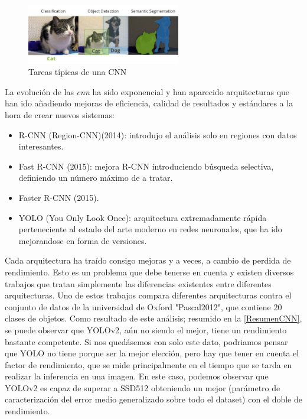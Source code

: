 \begin{figure}[H]
    \centering
    \includegraphics[width=0.6\textwidth]{images/4/TiposTareas.png}
    \caption{Tareas típicas de una CNN\cite{kallfelzsirmacekSEQUENTIALIMAGEPROCESSING2019}}
    \label{fig:tareasCNN}
\end{figure}

La evolución de las \textit{\acrshort{cnn}} ha sido exponencial y han aparecido arquitecturas que han ido añadiendo mejoras de eficiencia, calidad de resultados y estándares a la hora de crear nuevos 
sistemas:
\begin{itemize}
    \item R-CNN (Region-CNN)(2014): introdujo el análisis solo en regiones con datos interesantes.
    \item Fast R-CNN (2015): mejora R-CNN introduciendo búsqueda selectiva, definiendo un número máximo de  a tratar.
    \item Faster R-CNN (2015).
    \item YOLO (You Only Look Once)\cite{redmonYouOnlyLook2016}: arquitectura extremadamente rápida perteneciente al estado del arte moderno en redes neuronales, que ha ido mejorandose en forma de versiones.
\end{itemize}

Cada arquitectura ha traído consigo mejoras y a veces, a cambio de perdida de rendimiento. Esto es un problema que debe tenerse en cuenta y existen diversos trabajos\cite{hanAdvancedDeepLearningTechniques2018}\cite{manojkumarPerformanceComparisonReal2023}\cite{bhagyaOverviewDeepLearning2019} 
que tratan simplemente las diferencias existentes entre diferentes arquitecturas.\newline
Uno de estos trabajos\cite{hanAdvancedDeepLearningTechniques2018} compara diferentes arquitecturas contra el conjunto de datos de la universidad de Oxford "Pascal2012"\cite{PASCALVisualObject}, que contiene 20 clases de objetos.\newline
Como resultado de este análisis; resumido en la \autoref{ResumenCNN}, se puede observar que YOLOv2, aún no siendo el mejor, tiene un rendimiento bastante competente. Si nos quedásemos con solo este dato, podriamos pensar que YOLO 
no tiene porque ser la mejor elección, pero hay que tener en cuenta el factor de rendimiento, que se mide principalmente en el tiempo que se tarda en realizar la inferencia en una imagen. En este caso, podemos observar 
que YOLOv2 es capaz de superar a SSD512 obteniendo un mejor (parámetro de caracterización del error medio generalizado sobre todo el dataset) con el doble de rendimiento.

